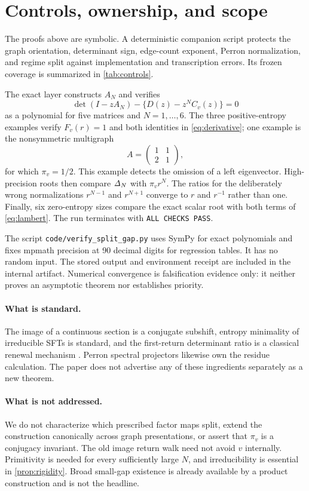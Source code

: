\section{Controls, ownership, and scope}
\label{sec:controls}

The proofs above are symbolic.  A deterministic companion script protects
the graph orientation, determinant sign, edge-count exponent, Perron
normalization, and regime split against implementation and transcription
errors.  Its frozen coverage is summarized in \cref{tab:controls}.



The exact layer constructs $A_N$ and verifies
\[
 \det(I-zA_N)-\{D(z)-z^NC_v(z)\}=0
\]
as a polynomial for five matrices and $N=1,\ldots,6$.  The three
positive-entropy examples verify $F_v(r)=1$ and both identities in
\cref{eq:derivative}; one example is the nonsymmetric multigraph
\[
 A=\begin{pmatrix}1&1\\2&1\end{pmatrix},
\]
for which $\pi_v=1/2$.  This example detects the omission of a left
eigenvector.  High-precision roots then compare $\mathit\Delta_N$ with $\pi_vr^N$.
The ratios for the deliberately wrong normalizations $r^{N-1}$ and
$r^{N+1}$ converge to $r$ and $r^{-1}$ rather than one.  Finally, six
zero-entropy sizes compare the exact scalar root with both terms of
\cref{eq:lambert}.  The run terminates with \texttt{ALL CHECKS PASS}.

The script \texttt{code/verify\_split\_gap.py} uses SymPy for exact
polynomials and fixes mpmath precision at 90 decimal digits for regression
tables.  It has no random input.  The stored output and environment receipt
are included in the internal artifact.  Numerical convergence is
falsification evidence only: it neither proves an asymptotic theorem nor
establishes priority.

\paragraph{What is standard.}
The image of a continuous section is a conjugate subshift, entropy minimality
of irreducible SFTs is standard, and the first-return determinant ratio is a
classical renewal mechanism \cite{LindMarcus2021,Gomez2010,BlockEtAl1980}.
Perron spectral projectors likewise own the residue calculation.  The paper
does not advertise any of these ingredients separately as a new theorem.

\paragraph{What is not addressed.}
We do not characterize which prescribed factor maps split, extend the
construction canonically across graph presentations, or assert that $\pi_v$
is a conjugacy invariant.  The old image return walk need not avoid $v$
internally.  Primitivity is needed for every sufficiently large $N$, and
irreducibility is essential in \cref{prop:rigidity}.  Broad small-gap
existence is already available by a product construction and is not the
headline.

